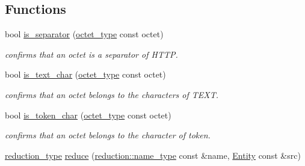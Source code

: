 \subsection*{Functions}
\begin{DoxyCompactItemize}
\item 
\hypertarget{namespacehryky_1_1http_a6ddc3f4da8f8a139b2710f91d20e2f2b}{bool \hyperlink{namespacehryky_1_1http_a6ddc3f4da8f8a139b2710f91d20e2f2b}{is\-\_\-separator} (\hyperlink{namespacehryky_a488cba8b666be33ccca70e819684e3c8}{octet\-\_\-type} const octet)}\label{namespacehryky_1_1http_a6ddc3f4da8f8a139b2710f91d20e2f2b}

\begin{DoxyCompactList}\small\item\em confirms that an octet is a separator of H\-T\-T\-P. \end{DoxyCompactList}\item 
\hypertarget{namespacehryky_1_1http_afcbf4f8e1cb971d2c408fcaec24f23cc}{bool \hyperlink{namespacehryky_1_1http_afcbf4f8e1cb971d2c408fcaec24f23cc}{is\-\_\-text\-\_\-char} (\hyperlink{namespacehryky_a488cba8b666be33ccca70e819684e3c8}{octet\-\_\-type} const octet)}\label{namespacehryky_1_1http_afcbf4f8e1cb971d2c408fcaec24f23cc}

\begin{DoxyCompactList}\small\item\em confirms that an octet belongs to the characters of T\-E\-X\-T. \end{DoxyCompactList}\item 
\hypertarget{namespacehryky_1_1http_a95a557831e38d08a9a5093725975e10e}{bool \hyperlink{namespacehryky_1_1http_a95a557831e38d08a9a5093725975e10e}{is\-\_\-token\-\_\-char} (\hyperlink{namespacehryky_a488cba8b666be33ccca70e819684e3c8}{octet\-\_\-type} const octet)}\label{namespacehryky_1_1http_a95a557831e38d08a9a5093725975e10e}

\begin{DoxyCompactList}\small\item\em confirms that an octet belongs to the character of token. \end{DoxyCompactList}\item 
\hypertarget{namespacehryky_1_1http_a08fc36a78a8e2908140fcd102829a566}{\hyperlink{namespacehryky_a343a9a4c36a586be5c2693156200eadc}{reduction\-\_\-type} \hyperlink{namespacehryky_1_1http_a08fc36a78a8e2908140fcd102829a566}{reduce} (\hyperlink{namespacehryky_1_1reduction_ac686c30a4c8d196bbd0f05629a6b921f}{reduction\-::name\-\_\-type} const \&name, \hyperlink{classhryky_1_1http_1_1_entity}{Entity} const \&src)}\label{namespacehryky_1_1http_a08fc36a78a8e2908140fcd102829a566}


\end{DoxyCompactItemize}
